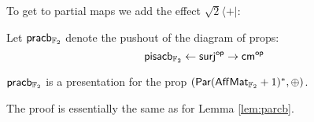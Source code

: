To get to partial maps we add the effect $\sqrt 2\langle +|$:
\begin{definition}
Let ${\sf pr}{\sf acb}_{\mathbb{F}_2}$ denote the pushout of the diagram of props:
$$
{\sf pis}{\sf acb}_{\mathbb{F}_2} \leftarrow {\sf surj}^{\mathsf{op}} \rightarrow {\sf cm}^{\mathsf{op}}
$$
\end{definition}
\begin{lemma}
\label{lem:paraffcb}
${\sf pr}{\sf acb}_{\mathbb{F}_2}$ is a presentation for the prop $(\mathsf{Par}(\mathsf{Aff}\mathsf{Mat}_{\mathbb{F}_2}+1)^*,\oplus)$.
\end{lemma}
The proof is essentially the same as for Lemma \ref{lem:parcb}.
